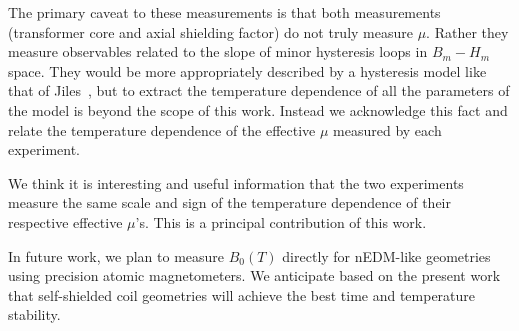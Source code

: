 The primary caveat to these measurements is that both measurements
(transformer core and axial shielding factor) do not truly measure
$\mu$.  Rather they measure observables related to the slope of minor
hysteresis loops in $B_m-H_m$ space.  They would be more appropriately
described by a hysteresis model like that of
Jiles~\cite{jiles1994frequency}, but to extract the temperature
dependence of all the parameters of the model is beyond the scope of
this work.  Instead we acknowledge this fact and relate the
temperature dependence of the effective $\mu$ measured by each
experiment.

We think it is interesting and useful information that the two
experiments measure the same scale and sign of the temperature
dependence of their respective effective $\mu$'s.  This is a principal
contribution of this work.

In future work, we plan to measure $B_0(T)$ directly for nEDM-like
geometries using precision atomic magnetometers.  We anticipate based
on the present work that self-shielded coil geometries will achieve
the best time and temperature stability.














